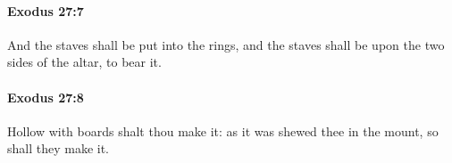 		\paragraph{Exodus 27:7} %
			\label{EXODUS-27-7}

			And the staves shall be put into the rings, and the staves shall be upon the two sides of the altar, to bear it.


		\paragraph{Exodus 27:8} %
			\label{EXODUS-27-8}

			Hollow with boards shalt thou make it: as it was shewed thee in the mount, so shall they make it.


